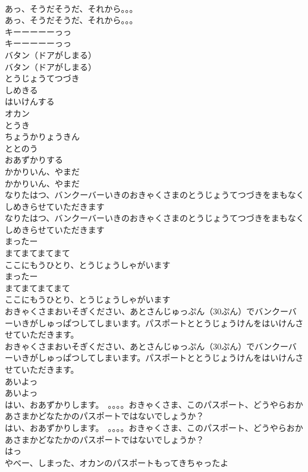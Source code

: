 \documentclass[8pt]{extreport}
\begin{document}
\begin{CJK}{UTF8}{min}
\\	あっ、そうだそうだ、それから。。。
\\	あっ、そうだそうだ、それから。。。
\\	キーーーーーっっ
\\	キーーーーーっっ
\\	バタン（ドアがしまる）
\\	バタン（ドアがしまる）
\\	とうじょうてつづき
\\	しめきる
\\	はいけんする
\\	オカン
\\	とうき
\\	ちょうかりょうきん
\\	ととのう
\\	おあずかりする
\\	かかりいん、やまだ
\\	かかりいん、やまだ
\\	なりたはつ、バンクーバーいきのおきゃくさまのとうじょうてつづきをまもなくしめきらせていただきます
\\	なりたはつ、バンクーバーいきのおきゃくさまのとうじょうてつづきをまもなくしめきらせていただきます
\\	まったー
\\	まてまてまてまて
\\	ここにもうひとり、とうじょうしゃがいます
\\	まったー
\\	まてまてまてまて
\\	ここにもうひとり、とうじょうしゃがいます
\\	おきゃくさまおいそぎください、あとさんじゅっぷん（30ぷん）でバンクーバーいきがしゅっぱつしてしまいます。パスポートととうじょうけんをはいけんさせていただきます。
\\	おきゃくさまおいそぎください、あとさんじゅっぷん（30ぷん）でバンクーバーいきがしゅっぱつしてしまいます。パスポートととうじょうけんをはいけんさせていただきます。
\\	あいよっ
\\	あいよっ
\\	はい、おあずかりします。　。。。。おきゃくさま、このパスポート、どうやらおかあさまかどなたかのパスポートではないでしょうか？
\\	はい、おあずかりします。　。。。。おきゃくさま、このパスポート、どうやらおかあさまかどなたかのパスポートではないでしょうか？
\\	はっ
\\	やべー、しまった、オカンのパスポートもってきちゃったよ

\end{CJK}
\end{document}
